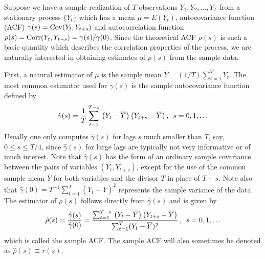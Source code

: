 Suppose we have a sample realization of $T$ observations $Y_1, Y_2, \ldots, Y_T$ from a stationary process $\{Y_t\}$ which has a mean $\mu=E(Y_t)$, autocovariance function (ACF) $\gamma(s)=\operatorname{Cov}(Y_t,Y_{t+s})$ and autocorrelation function $\rho(s)=\operatorname{Corr}(Y_t,Y_{t+s}) = \gamma(s)/\gamma(0)$. Since the theoretical ACF $\rho(s)$ is such a basic quantity which describes the correlation properties of the process, we are naturally interested in obtaining estimates of $\rho(s)$ from the sample data.


First, a natural estimator of $\mu$ is the sample mean $\overline{Y}=(1/T)\sum_{t=1}^T Y_t$. The most common estimator used for $\gamma(s)$ is the sample autocovariance function defined by
	\[
	\hat{\gamma}(s)= \frac{1}{T} \sum_{t=1}^{T-s} \, \left(Y_{t}-\overline{Y}\right) \left(Y_{t+s}-\overline{Y}\right), \enskip s=0, 1, \ldots
	\]
Usually one only computes $\hat{\gamma}(s)$ for lags $s$ much smaller than $T$, say, $0 \leq s \leq T/4$, since $\hat{\gamma}(s)$ for large lags are typically not very informative or of much interest. Note that $\hat{\gamma}(s)$ has the form of an ordinary sample covariance between the pairs of variables $(Y_t, Y_{t+s})$, except for the use of the common sample mean $\overline{Y}$ for both variables and the divisor $T$ in place of $T-s$.  Note also that $\hat{\gamma}(0) = T^{-1}\sum_{t=1}^T(Y_t-\overline{Y})^2$ represents the sample variance of the data.  The estimator of $\rho(s)$ follows directly from $\hat{\gamma}(s)$ and is given by
	\begin{equation}\label{eqn:hatrho}
         \hat{\rho}(s) = \frac{\hat{\gamma}(s)}{\hat{\gamma}(0)}= \frac{\sum_{t=1}^{T-s} \, \left(Y_{t}-\overline{Y}\right) \left(Y_{t+s}-\overline{Y}\right)}{\sum_{t=1}^T(Y_t-\overline{Y})^2}\, , \enskip s = 0, 1, \ldots 
	\end{equation}
which is called the sample ACF.  The sample ACF will also sometimes be denoted as $\hat{\rho}(s) \equiv r(s)$.


